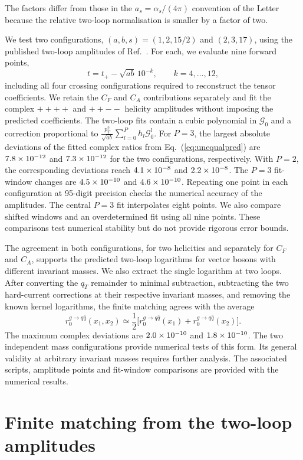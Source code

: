 \documentclass[%
 onecolumn,
 superscriptaddress,
 preprintnumbers,
 nofootinbib,
 amsmath,amssymb,
 aps,
 prl,
]{revtex4-2}
\newcommand{\G}{\mathcal G}
\begin{document}
The factors differ from those in the
$a_s=\alpha_s/(4\pi)$ convention of the
Letter because the relative two-loop
normalisation is smaller by a factor of two.

We test two configurations,
$(a,b,s)=(1,2,15/2)$ and $(2,3,17)$,
using the published two-loop amplitudes
of Ref.~\cite{vonManteuffel:2015msa}.
For each, we evaluate nine forward points,
\[
t=t_+-\sqrt{ab}\,10^{-k},
\qquad k=4,\ldots,12,
\]
including all four crossing configurations
required to reconstruct the tensor
coefficients. We retain the $C_F$ and
$C_A$ contributions separately and fit
the complex $++++$ and $++--$ helicity
amplitudes without imposing the predicted
coefficients.
%
The two-loop fits contain a cubic
polynomial in $\G_0$ and a correction
proportional to
$\frac{p_T^2}{\sqrt{ab}}
\sum_{l=0}^{P}h_l\G_0^l$.
For $P=3$, the largest absolute deviations
of the fitted complex ratios from
Eq.~(\ref{eq:unequalpred}) are
$7.8\times10^{-12}$ and
$7.3\times10^{-12}$ for the two
configurations, respectively.
With $P=2$, the corresponding deviations
reach $4.1\times10^{-8}$ and $2.2\times10^{-8}$.
The $P=3$ fit-window changes are
$4.5\times10^{-10}$ and $4.6\times10^{-10}$.
Repeating one point in each configuration
at 95-digit precision checks the
numerical accuracy of the amplitudes.
%
The central $P=3$ fit interpolates eight
points. We also compare shifted windows
and an overdetermined fit using all nine
points. These comparisons test numerical
stability but do not provide rigorous
error bounds.

The agreement in both configurations,
for two helicities and separately for
$C_F$ and $C_A$, supports the predicted
two-loop logarithms for vector bosons
with different invariant masses.
%
We also extract the single logarithm at two loops.
After converting the $q_T$ remainder to minimal
subtraction, subtracting the two hard-current
corrections at their respective invariant masses,
and removing the known kernel logarithms, the
finite matching agrees with the average
\[
r_0^{g\to q\bar q}(x_1,x_2)
\simeq\frac12\big[r_0^{g\to q\bar q}(x_1)
+r_0^{g\to q\bar q}(x_2)\big].
\]
The maximum complex deviations are
$2.0\times10^{-10}$ and $1.8\times10^{-10}$.
The two independent mass configurations provide
numerical tests of this form. Its general validity
at arbitrary invariant masses requires further
analysis. The associated scripts, amplitude points
and fit-window comparisons are provided with the
numerical results.




\section{Finite matching from the two-loop amplitudes}
\label{sec:r0}
\end{document}
